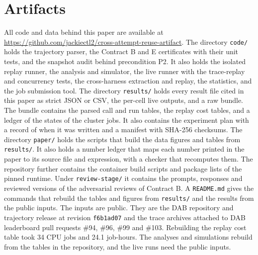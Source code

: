 \section*{Artifacts}
\label{sec:artifacts}

All code and data behind this paper are available at \url{https://github.com/jackiectl2/cross-attempt-reuse-artifact}. The
directory \texttt{code/} holds the trajectory parser, the Contract B and E certificates with their unit tests, and
the snapshot audit behind precondition P2. It also holds the isolated replay runner, the analysis and simulator, the
live runner with the trace-replay and concurrency tests, the cross-harness extraction and replay, the statistics,
and the job submission tool. The directory \texttt{results/} holds every result file cited in this paper as strict
JSON or CSV, the per-cell live outputs, and a raw bundle. The bundle contains the parsed call and run tables, the
replay cost tables, and a ledger of the states of the cluster jobs. It also contains the
experiment plan with a record of when it was written and a manifest with SHA-256 checksums. The directory
\texttt{paper/} holds the scripts that build the data figures and tables from \texttt{results/}. It also holds a
number ledger that maps each number printed in the paper to its source file and expression, with a checker that
recomputes them. The repository further contains the container build scripts and package lists of the pinned runtime.
Under \texttt{review-stage/} it contains the prompts, responses and reviewed versions of the adversarial reviews of
Contract B. A \texttt{README.md} gives the commands that rebuild the tables and figures from \texttt{results/} and
the results from the public inputs. The inputs are public. They are the DAB repository and trajectory release
\cite{ma2026dab} at revision \texttt{f6b1ad07} and the trace archives attached to DAB leaderboard pull requests \#94,
\#96, \#99 and \#103. Rebuilding the replay cost table took 34 CPU jobs and 24.1 job-hours. The analyses and
simulations rebuild from the tables in the repository, and the live runs need the public inputs.
